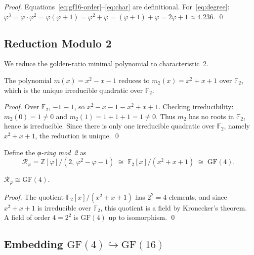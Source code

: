 \begin{proof}
Equations~\eqref{eq:gf16-order}–\eqref{eq:char} are definitional.
For~\eqref{eq:degree}: \(\varphi^3 = \varphi\cdot\varphi^2 = \varphi(\varphi+1)=\varphi^2+\varphi=(\varphi+1)+\varphi=2\varphi+1\approx 4.236\).
\qed
\end{proof}

\subsection{Reduction Modulo 2}
\label{sec:gf16-phi-mod2}

We reduce the golden-ratio minimal polynomial to characteristic~2.

\begin{lemma}
\label{lem:phi-mod2}
The polynomial \(m(x) = x^2-x-1\) reduces to
\(m_2(x) = x^2+x+1\) over \(\mathbb{F}_2\),
which is the unique irreducible quadratic over \(\mathbb{F}_2\).
\end{lemma}

\begin{proof}
Over \(\mathbb{F}_2\), \(-1 \equiv 1\), so
\(x^2 - x - 1 \equiv x^2 + x + 1\).
Checking irreducibility: \(m_2(0)=1\neq 0\) and \(m_2(1)=1+1+1=1\neq 0\).
Thus \(m_2\) has no roots in \(\mathbb{F}_2\), hence is irreducible.
Since there is only one irreducible quadratic over \(\mathbb{F}_2\),
namely \(x^2+x+1\), the reduction is unique.
\qed
\end{proof}

\begin{definition}
\label{def:phi-ring-mod2}
Define the \emph{φ-ring mod~2} as
\[
  \mathcal{R}_\varphi = \mathbb{Z}[\varphi]/(2,\,\varphi^2-\varphi-1)
    \;\cong\; \mathbb{F}_2[x]/(x^2+x+1) \;\cong\; \mathrm{GF}(4).
\]
\end{definition}

\begin{proposition}
\(\mathcal{R}_\varphi \cong \mathrm{GF}(4)\).
\end{proposition}

\begin{proof}
The quotient \(\mathbb{F}_2[x]/(x^2+x+1)\) has \(2^2=4\) elements,
and since \(x^2+x+1\) is irreducible over \(\mathbb{F}_2\),
this quotient is a field by Kronecker's theorem.
A field of order \(4=2^2\) is \(\mathrm{GF}(4)\) up to isomorphism.
\qed
\end{proof}

\subsection{Embedding \(\mathrm{GF}(4)\hookrightarrow\mathrm{GF}(16)\)}
\label{sec:gf16-embed}

